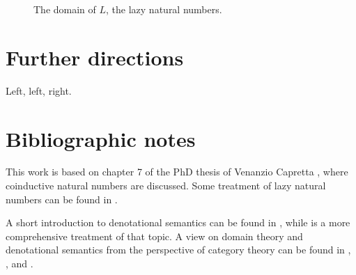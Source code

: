 \documentclass[a4paper]{article}
\begin{document}
\begin{figure}
\begin{center}
\end{center}
\caption{The domain of $L$, the lazy natural numbers.}
\label{figDomainOfLazyNaturals}
\end{figure}


\section{Further directions}

Left, left, right.

\section{Bibliographic notes}

This work is based on chapter 7 of the PhD thesis of Venanzio Capretta
\cite{Capretta2002}, where coinductive natural numbers are discussed.  Some
treatment of lazy natural numbers can be found in \cite{Escardo1993}.

A short introduction to denotational semantics can be found in
\cite{Allison1986}, while \cite{Gunter1992} is a more comprehensive treatment of
that topic.  A view on domain theory and denotational semantics from the
perspective of category theory can be found in \cite{Pierce1991},
\cite{Bird1997}, \cite{Mitchell1996} and \cite{BarrWells1990}.




\end{document}
